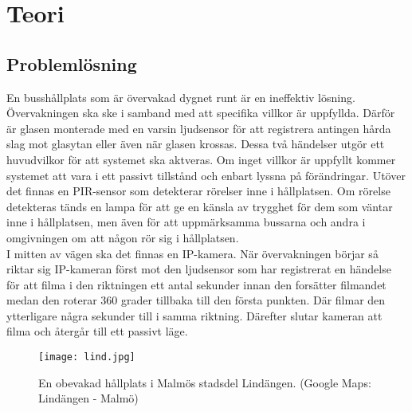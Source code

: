 
\chapter{Teori} %
\label{teori}

\ifpdf
    \graphicspath{{3_theory/figures/PNG/}{3/figures/PDF/}{3/figures/}}
\else
    \graphicspath{{3_theory/figures/EPS/}{3/figures/}}
\fi

\graphicspath{{3_theory/figures/}{3/figures/}}


\section{Problemlösning}

En busshållplats som är övervakad dygnet runt är en ineffektiv lösning. Övervakningen ska ske i samband med att specifika villkor är uppfyllda. Därför är glasen monterade med en varsin ljudsensor för att registrera antingen hårda slag mot glasytan eller även när glasen krossas. Dessa två händelser utgör ett huvudvilkor för att systemet ska aktveras. Om inget villkor är uppfyllt kommer systemet att vara i ett passivt tillstånd och enbart lyssna på förändringar. Utöver det finnas en PIR-sensor som detekterar rörelser inne i hållplatsen. Om rörelse detekteras tänds en lampa för att ge en känsla av trygghet för dem som väntar inne i hållplatsen, men även för att uppmärksamma bussarna och andra i omgivningen om att någon rör sig i hållplatsen. \\

I mitten av vägen ska det finnas en IP-kamera. När övervakningen börjar så riktar sig IP-kameran först mot den ljudsensor som har registrerat en händelse för att filma i den riktningen ett antal sekunder innan den forsätter filmandet medan den roterar 360 grader tillbaka till den första punkten. Där filmar den ytterligare några sekunder till i samma riktning. Därefter slutar kameran att filma och återgår till ett passivt läge.

\begin{figure}[h]
  \texttt{[image: lind.jpg]}
  \caption{En obevakad hållplats i Malmös stadsdel Lindängen. (Google Maps: Lindängen - Malmö)}
  \label{fig:lind}
\end{figure}





